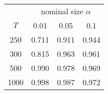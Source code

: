 % 
\begin{tabular}{cccc}
  \hline
  & \multicolumn{3}{c}{nominal size $\alpha$} \\
 $T$ & 0.01 & 0.05 & 0.1 \\
 \hline
250 & 0.711 & 0.911 & 0.944 \\ 
  300 & 0.815 & 0.963 & 0.961 \\ 
  500 & 0.990 & 0.978 & 0.969 \\ 
  1000 & 0.998 & 0.987 & 0.972 \\ 
   \hline
\end{tabular}
